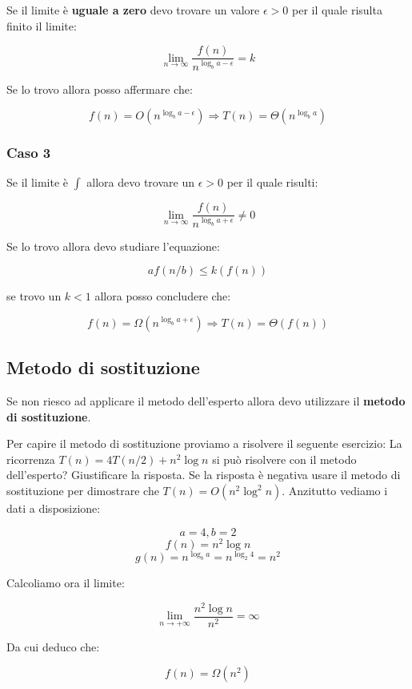 Se il limite è \textbf{uguale a zero} devo trovare un valore $\epsilon > 0$ per il quale risulta finito il limite:

$$\lim_{n \to \infty}\frac{f(n)}{n^{\log_ba-\epsilon}}=k$$

Se lo trovo allora posso affermare che:

$$f(n)=O(n^{\log_ba-\epsilon}) \Rightarrow T(n)=\Theta(n^{\log_ba})$$

\subsubsection{Caso 3}

Se il limite è $\int$ allora devo trovare un $\epsilon >0$ per il quale risulti:

$$\lim_{n \to \infty}\frac{f(n)}{n^{\log_ba+\epsilon}}\neq 0$$

Se lo trovo allora devo studiare l'equazione:

$$af(n/b)\le k(f(n))$$

se trovo un $k<1$ allora posso concludere che:

$$f(n)=\Omega(n^{\log_ba+\epsilon})\Rightarrow T(n)=\Theta(f(n))$$

\subsection{Metodo di sostituzione}

Se non riesco ad applicare il metodo dell'esperto allora devo utilizzare il \textbf{metodo di sostituzione}.

Per capire il metodo di sostituzione proviamo a risolvere il seguente esercizio:
\linebreak
\linebreak
La ricorrenza $T(n)=4T(n/2)+n^2\log n$ si può risolvere con il metodo dell'esperto? Giustificare la risposta. Se la risposta è negativa usare il metodo di sostituzione per dimostrare che $T(n)=O(n^2\log^2n)$.
\linebreak
\linebreak
Anzitutto vediamo i dati a disposizione:

$$a = 4, b = 2$$ 
$$f(n)=n^2\log n$$
$$g(n)=n^{\log_{b}a}=n^{\log_{2}4}=n^2$$

Calcoliamo ora il limite:

$$\lim_{n \to +\infty}\frac{n^2\log n}{n^2}=\infty$$

Da cui deduco che:

$$f(n)=\Omega(n^2)$$

